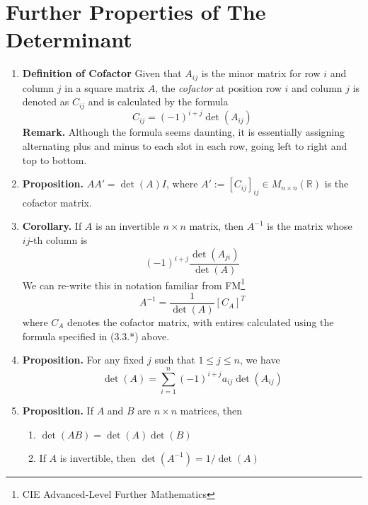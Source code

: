 \documentclass[oneside, 12pt]{book}
\newcommand{\settag}[1]{\renewcommand{\theenumi}{#1}}
\newcommand{\R}{\mathbb{R}}
\newcommand{\tbf}[1]{\textbf{#1}}
\newcommand{\tit}[1]{\textit{#1}}
\newcommand{\para}[1]{\item \tbf{#1}}
\begin{document}
\section{Further Properties of The Determinant} 
\begin{enumerate}
    \settag{3.3.*}
    \para{Definition of Cofactor} Given that $A_{ij}$ is the minor matrix for row $i$ and column $j$ in a square matrix $A$, the \tit{cofactor} at position row $i$ and column $j$ is denoted as $C_{ij}$ and is calculated by the formula 
    \begin{equation*}
        C_{ij}=(−1)^{i+j}\det(A_{ij})
    \end{equation*}
    \tbf{Remark.} Although the formula seems daunting, it is essentially assigning alternating plus and minus to each slot in each row, going left to right and top to bottom.

    \settag{3.3.1}
    \para{Proposition.} $AA'=\det(A)I$, where $A':=\left[ C_{ij} \right]_{ij} \in M_{n \times n}(\R)$ is the cofactor matrix.
    
    \settag{3.3.2}
    \para{Corollary.} If $A$ is an invertible $n \times n$ matrix, then $A^{-1}$ is the matrix whose $ij$-th column is
    \begin{equation*}
        (-1)^{i+j}\frac{\det(A_{ji})}{\det(A)}
    \end{equation*}
    We can re-write this in notation familiar from FM\footnote{CIE Advanced-Level Further Mathematics}
    \begin{equation*}
        A^{-1} = \frac{1}{\det(A)}\left[C_A\right]^T
    \end{equation*}
    where $C_A$ denotes the cofactor matrix, with entires calculated using the formula specified in (3.3.*) above.
    
    \settag{3.3.4}
    \para{Proposition.} For any fixed $j$ such that $1 \leq j \leq n$, we have
    \begin{equation*}
        \det(A) = \sum_{i=1}^{n}(-1)^{i+j}a_{ij}\det(A_{ij})
    \end{equation*}
    
    \settag{3.3.7}
    \para{Proposition.} If $A$ and $B$ are $n\times n$ matrices, then
    \begin{enumerate}
        \item $\det(AB) = \det(A)\det(B)$
        \item If $A$ is invertible, then $\det(A^{-1}) = 1/\det(A)$
    \end{enumerate}
    

\end{enumerate}
\end{document}
